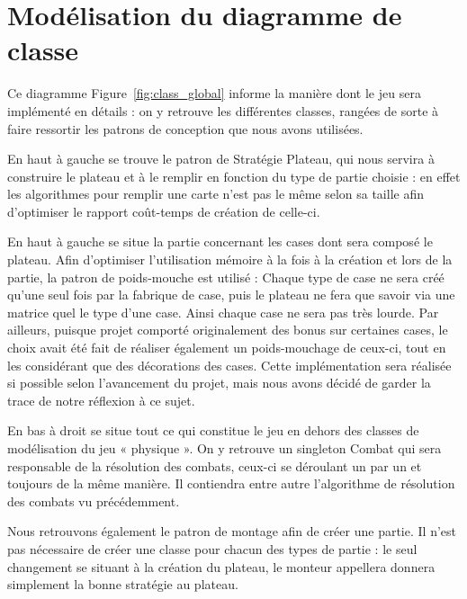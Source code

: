 \documentclass[a4paper]{article}%
\begin{document}
\section{Modélisation du diagramme de classe}

Ce diagramme Figure~\ref{fig:class_global} informe la manière dont le jeu sera implémenté en détails : on y retrouve les différentes classes, rangées de sorte à faire ressortir les patrons de conception que nous avons utilisées.

\medskip

	En haut à gauche se trouve le patron de Stratégie Plateau, qui nous servira à construire le plateau et à le remplir en fonction du type de partie choisie : en effet les algorithmes pour remplir une carte n'est pas le même selon sa taille afin d'optimiser le rapport coût-temps de création de celle-ci.

\medskip

	En haut à gauche se situe la partie concernant les cases dont sera composé le plateau. Afin d'optimiser l'utilisation mémoire à la fois à la création et lors de la partie, la patron de poids-mouche est utilisé : Chaque type de case ne sera créé qu'une seul fois par la fabrique de case, puis le plateau ne fera que savoir via une matrice quel le type d'une case. Ainsi chaque case ne sera pas très lourde.
Par ailleurs, puisque projet comporté originalement des bonus sur certaines cases, le choix avait été fait de réaliser également un poids-mouchage de ceux-ci, tout en les considérant que des décorations des cases. Cette implémentation sera réalisée si possible selon l'avancement du projet, mais nous avons décidé de garder la trace de notre réflexion à ce sujet.

\medskip

	En bas à droit se situe tout ce qui constitue le jeu en dehors des classes de modélisation du jeu « physique ». On y retrouve un singleton Combat qui sera responsable de la résolution des combats, ceux-ci se déroulant un par un et toujours de la même manière. Il contiendra entre autre l'algorithme de résolution des combats vu précédemment.

\medskip

Nous retrouvons également le patron de montage afin de créer une partie. Il n'est pas nécessaire de créer une classe pour chacun des types de partie : le seul changement se situant à la création du plateau, le monteur appellera donnera simplement la bonne stratégie au plateau.

\medskip
\end{document}
